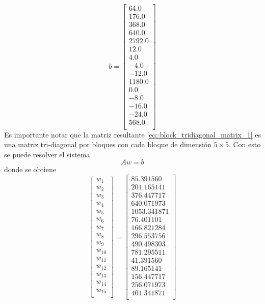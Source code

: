 \documentclass[a4paper]{article}
\begin{document}
\begin{equation*}
b =
\begin{bmatrix}
 64.0 \\
 176.0 \\
 368.0 \\
 640.0 \\
2792.0 \\
  12.0 \\
   4.0 \\
  -4.0 \\
 -12.0 \\
1180.0 \\
   0.0 \\
  -8.0 \\
 -16.0 \\
 -24.0 \\
 568.0 \\
\end{bmatrix}
\end{equation*}
Es importante notar que la matriz resultante \ref{eq::block_tridiagonal_matrix_1} es una matriz tri-diagonal por bloques con cada bloque de dimensión $5\times 5$. Con esto se puede resolver el sistema
\begin{equation}
Aw=b
\end{equation}
donde se obtiene
\begin{equation}
\begin{bmatrix}
w_1 \\
w_2 \\
w_3 \\
w_4 \\
w_5 \\
w_6 \\
w_7 \\
w_8 \\
w_9 \\
w_{10} \\
w_{11} \\
w_{12} \\
w_{13} \\
w_{14} \\
w_{15} \\
\end{bmatrix}=
\begin{bmatrix}
  85.391560 \\
 201.165141 \\
 376.447717 \\
 640.071973 \\
1053.341871 \\
  76.401101 \\
 166.821284 \\
 296.553756 \\
 490.498303 \\
 781.295511 \\
  41.391560 \\
  89.165141 \\
 156.447717 \\
 256.071973 \\
 401.341871 \\
\end{bmatrix}
\end{equation}
\end{document}
